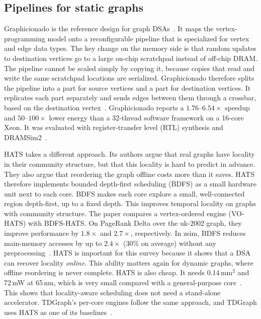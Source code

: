 \documentclass[journal,onecolumn]{IEEEtran}
\begin{document}
\subsection{Pipelines for static graphs}
Graphicionado is the reference design for graph DSAs~\cite{ham2016graphicionado}. It maps the vertex-programming model onto a reconfigurable pipeline that is specialized for vertex and edge data types. The key change on the memory side is that random updates to destination vertices go to a large on-chip scratchpad instead of off-chip DRAM. The pipeline cannot be scaled simply by copying it, because copies that read and write the same scratchpad locations are serialized. Graphicionado therefore splits the pipeline into a part for source vertices and a part for destination vertices. It replicates each part separately and sends edges between them through a crossbar, based on the destination vertex~\cite{ham2016graphicionado}. Graphicionado reports a $1.76$--$6.54\times$ speedup and $50$--$100\times$ lower energy than a 32-thread software framework on a 16-core Xeon. It was evaluated with register-transfer level (RTL) synthesis and DRAMSim2~\cite{ham2016graphicionado}.

HATS takes a different approach. Its authors argue that real graphs have locality in their community structure, but that this locality is hard to predict in advance. They also argue that reordering the graph offline costs more than it saves. HATS therefore implements bounded depth-first scheduling (BDFS) as a small hardware unit next to each core. BDFS makes each core explore a small, well-connected region depth-first, up to a fixed depth. This improves temporal locality on graphs with community structure. The paper compares a vertex-ordered engine (VO-HATS) with BDFS-HATS. On PageRank Delta over the uk-2002 graph, they improve performance by $1.8\times$ and $2.7\times$, respectively. In zsim, BDFS reduces main-memory accesses by up to $2.4\times$ (30\% on average) without any preprocessing~\cite{mukkara2018hats}. HATS is important for this survey because it shows that a DSA can recover locality \emph{online}. This ability matters again for dynamic graphs, where offline reordering is never complete. HATS is also cheap. It needs 0.14\,mm$^2$ and 72\,mW at 65\,nm, which is very small compared with a general-purpose core~\cite{mukkara2018hats}. This shows that locality-aware scheduling does not need a stand-alone accelerator. TDGraph's per-core engines follow the same approach, and TDGraph uses HATS as one of its baselines~\cite{zhao2022tdgraph}.
\end{document}
